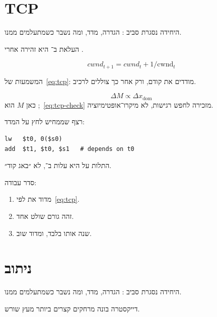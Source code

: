 \chapter{TCP}
\label{ch:tcp}

היחידה נסגרת סביב : הגדרה, מדד, ומה נשבר כשמתעלמים ממנו.

\begin{keybox}[frametitle={רעיון מפתח — TCP}]
העלאת  ב־ היא זהירה אחרי .
\end{keybox}

\begin{equation}
\label{eq:tcp}
cwnd_{t+1}=cwnd_t + 1/\mathrm{cwnd}_t
\end{equation}

המשמעות של~\eqref{eq:tcp}: מודדים את  קודם, ורק אחר כך צוללים לרכיב.

\begin{equation}
\label{eq:tcp-check}
\Delta M \propto \Delta x_{\mathrm{dom}}
\end{equation}
כאן $M$ הוא ;~\eqref{eq:tcp-check} מזכירה לחפש רגישות, לא מיקרו־אופטימיזציה.

רצף שממחיש לחץ על המדד:
\begin{asmblock}
\begin{lstlisting}[style=asm]
lw   $t0, 0($s0)
add  $t1, $t0, $s1   # depends on t0
\end{lstlisting}
\end{asmblock}
התלות על  היא עלות ב־, לא ״באג קוד״.

סדר עבודה:
\begin{enumerate}
\item[(\textbf{א})] מדוד את  לפי~\eqref{eq:tcp}.
\item[(\textbf{ב})] זהה גורם שולט אחד.
\item[(\textbf{ג})] שנה אותו בלבד, ומדוד שוב.
\end{enumerate}

\chapter{ניתוב}
\label{ch:routing}

היחידה נסגרת סביב : הגדרה, מדד, ומה נשבר כשמתעלמים ממנו.

\begin{defbox}[frametitle={הגדרה — ניתוב}]
דייקסטרה בונה מרחקים קצרים ביותר מעץ שורש.
\end{defbox}

